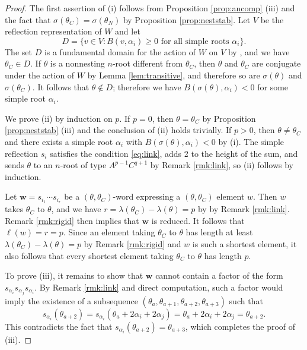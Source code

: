 \documentclass[11pt]{amsart}
\theoremstyle{plain}
\theoremstyle{definition}
\theoremstyle{remark}
\numberwithin{equation}{subsection}
\newcommand{\al}{\alpha}
\newcommand{\bfw}{\mathbf{w}}
\begin{document}
\begin{proof}
The first assertion of (i) follows from Proposition \ref{prop:ancomp} (iii) and
the fact that $\sigma(\theta_C)=\sigma(\theta_N)$ by Proposition
\ref{prop:neststab}.  Let $V$ be the reflection representation of $W$ and let $$
D = \{v \in V : B(v, \al_i) \ge 0 \text{\ for\ all\ simple\ roots\ } \al_i\}. $$
The set $D$ is a fundamental domain for the action of $W$ on $V$ by
\cite[Theorem 1.12 (a)]{humphreys90}, and we have $\theta_C\in D$. If $\theta$
is a nonnesting $n$-root different from $\theta_C$, then $\theta$ and $\theta_C$
are conjugate under the action of $W$ by Lemma \ref{lem:transitive}, and therefore
so are $\sigma(\theta)$ and $\sigma(\theta_C)$. It follows that $\theta\not\in
D$; therefore we have $B(\sigma(\theta),\al_i)<0$ for some simple root $\al_i$.

We prove (ii) by induction on $p$. If $p=0$, then $\theta=\theta_C$ by
Proposition \ref{prop:neststab} (iii) and the conclusion of (ii) holds
trivially. If $p>0$, then $\theta\neq \theta_C$ and there exists a simple root
$\al_i$ with $B(\sigma(\theta),\al_i)<0$ by (i). The simple reflection $s_i$
satisfies the condition \eqref{eq:link}, adds 2 to the height of the sum, and
sends $\theta$ to an $n$-root of type $A^{p-1}C^{q+1}$ by Remark \ref{rmk:link},
so (ii) follows by induction.

Let $\bfw=s_{i_1}\cdots s_{i_r}$ be a $(\theta,\theta_C)$-word expressing a
$(\theta,\theta_C)$ element $w$. Then $w$ takes $\theta_C$ to $\theta$, and we
have $r=\lambda(\theta_C)-\lambda(\theta)=p$ by by Remark \ref{rmk:link}. Remark
\ref{rmk:rigid} then implies that $\bfw$ is reduced.
It follows that $\ell(w)=r=p$. Since an element taking $\theta_C$ to $\theta$
has length at least $\lambda(\theta_C)-\lambda(\theta)=p$ by Remark
\ref{rmk:rigid} and $w$ is such a shortest element, it also follows that every
shortest element taking $\theta_C$ to $\theta$ has length $p$.

To prove (iii), it remains to show that $\bfw$ cannot contain a factor of the
form $s_{\al_i} s_{\al_j} s_{\al_i}$. By Remark \ref{rmk:link} and direct
computation, such a factor would imply the existence of a subsequence
$(\theta_a, \theta_{a+1}, \theta_{a+2}, \theta_{a+3})$ such that \[
s_{\al_i}(\theta_{a+2}) = s_{\al_i}(\theta_a + 2\al_i + 2\al_j) = \theta_a +
2\al_i + 2\al_j = \theta_{a+2}.  \] This contradicts the fact that
$s_{\al_i}(\theta_{a+2})=\theta_{a+3}$, which completes the proof of (iii).


\end{proof}
\end{document}
